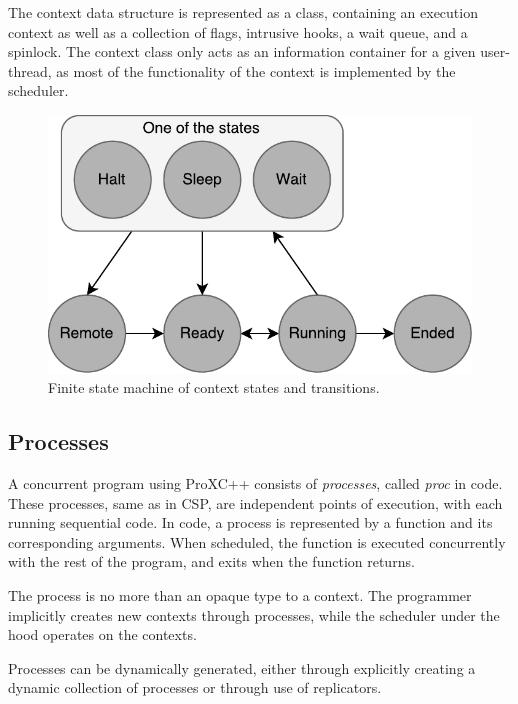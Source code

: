 The context data structure is represented as a class, containing an execution context as well as a collection of flags, intrusive hooks, a wait queue, and a spinlock. The context class only acts as an information container for a given user\hyp{}thread, as most of the functionality of the context is implemented by the scheduler.

\begin{figure}[h!]
    \centering
    \includegraphics[width=0.6\linewidth]{fig/context_states}
    \caption{Finite state machine of context states and transitions.}
    \label{fig:runtime_overview}
\end{figure}


\FloatBarrier
\subsection{Processes}
\label{subsec:processes}

A concurrent program using ProXC++ consists of \textit{processes}, called \textit{proc} in code. These processes, same as in CSP, are independent points of execution, with each running sequential code. In code, a process is represented by a function and its corresponding arguments. When scheduled, the function is executed concurrently with the rest of the program, and exits when the function returns. 

The process is no more than an opaque type to a context. The programmer implicitly creates new contexts through processes, while the scheduler under the hood operates on the contexts.

Processes can be dynamically generated, either through explicitly creating a dynamic collection of processes or through use of replicators.



\FloatBarrier
